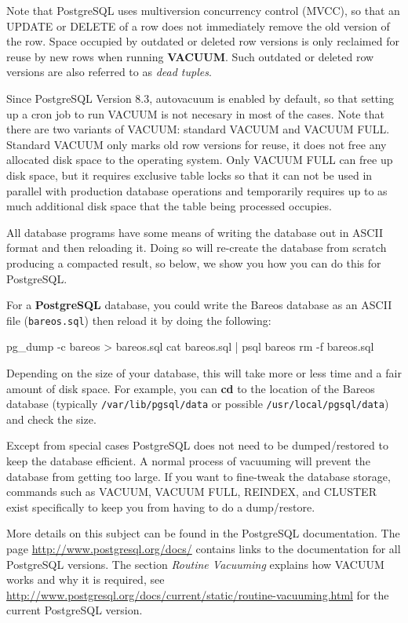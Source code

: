 Note that PostgreSQL uses multiversion concurrency control (MVCC), so that
an UPDATE or DELETE of a row does not immediately remove the old version of the
row.  Space occupied by outdated or deleted row versions is only reclaimed for
reuse by new rows when running \textbf{VACUUM}. Such outdated or deleted row versions
are also referred to as \emph{dead tuples}.

Since PostgreSQL Version 8.3, autovacuum is enabled by default, so that setting
up a cron job to run VACUUM is not necesary in most of the cases. Note that
there are two variants of VACUUM: standard VACUUM and VACUUM FULL. Standard
VACUUM only marks old row versions for reuse, it does not free any allocated
disk space to the operating system. Only VACUUM FULL can free up disk space,
but it requires exclusive table locks so that it can not be used in parallel
with production database operations and temporarily requires up to as much
additional disk space that the table being processed occupies.

All database programs have some means of writing the database out in ASCII
format and then reloading it. Doing so will re-create the database from
scratch producing a compacted result, so below, we show you how you can do
this for PostgreSQL.

For a {\bf PostgreSQL} database, you could write the Bareos database as an
ASCII file (\texttt{bareos.sql}) then reload it by doing the following:

\begin{commands}{}
pg_dump -c bareos > bareos.sql
cat bareos.sql | psql bareos
rm -f bareos.sql
\end{commands}

Depending on the size of your database, this will take more or less time and a
fair amount of disk space. For example, you can {\bf cd} to the location of
the Bareos database (typically \texttt{/var/lib/pgsql/data} or possible
\texttt{/usr/local/pgsql/data}) and check the size.

Except from special cases PostgreSQL does not
need to be dumped/restored to keep the database efficient.  A normal
process of vacuuming will prevent the database from getting too
large.  If you want to fine-tweak the database storage, commands such
as VACUUM, VACUUM FULL, REINDEX, and CLUSTER exist specifically to keep you
from having to do a dump/restore.

More details on this subject can be found in the PostgreSQL documentation.
The page \url{http://www.postgresql.org/docs/} contains links to the documentation
for all PostgreSQL versions. The section \emph{Routine Vacuuming} explains
how VACUUM works and why it is required, see
\url{http://www.postgresql.org/docs/current/static/routine-vacuuming.html}
for the current PostgreSQL version.

